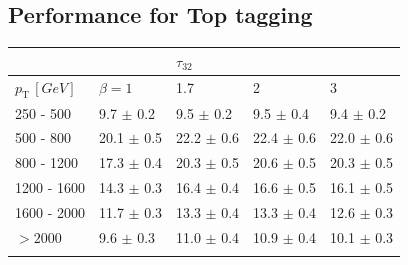 \subsection{Performance for Top tagging}\label{appendix:top_optimisation}
\begin{table}[H]
\centering
\begin{tabular}{lllll}
\rowcolor{Gray} \multicolumn{1}{l||}{\textbf{Calorimeter}}    &                                & $\tau_{32}$               &                           & \multicolumn{1}{l|}{}     \\ \hline
\multicolumn{1}{l||}{$p_{\mathrm{T}} \, [GeV]$} & \multicolumn{1}{l|}{$\beta=1$} & \multicolumn{1}{l|}{\cellcolor{Gray2}1.7}  & \multicolumn{1}{l|}{\cellcolor{Gray2}2}    & \multicolumn{1}{l|}{\cellcolor{Gray2}3}    \\ \hline \hline
\multicolumn{1}{l||}{250 - 500}      & \multicolumn{1}{l|}{\cellcolor{Red!50}9.7 $\pm$ 0.2}       	& \multicolumn{1}{l|}{9.5 $\pm$ 0.2}  					& \multicolumn{1}{l|}{9.5 $\pm$ 0.4}  					& \multicolumn{1}{l|}{9.4 $\pm$ 0.2}  \\
\multicolumn{1}{l||}{500 - 800}      & \multicolumn{1}{l|}{20.1 $\pm$ 0.5}      					& \multicolumn{1}{l|}{22.2 $\pm$ 0.6} 					& \multicolumn{1}{l|}{\cellcolor{Red!50}22.4 $\pm$ 0.6} & \multicolumn{1}{l|}{22.0 $\pm$ 0.6} \\
\multicolumn{1}{l||}{800 - 1200}     & \multicolumn{1}{l|}{17.3 $\pm$ 0.4}      					& \multicolumn{1}{l|}{20.3 $\pm$ 0.5} 					& \multicolumn{1}{l|}{\cellcolor{Red!50}20.6 $\pm$ 0.5} & \multicolumn{1}{l|}{20.3 $\pm$ 0.5} \\
\multicolumn{1}{l||}{1200 - 1600}    & \multicolumn{1}{l|}{14.3 $\pm$ 0.3}      					& \multicolumn{1}{l|}{16.4 $\pm$ 0.4} 					& \multicolumn{1}{l|}{\cellcolor{Red!50}16.6 $\pm$ 0.5} & \multicolumn{1}{l|}{16.1 $\pm$ 0.5} \\
\multicolumn{1}{l||}{1600 - 2000}    & \multicolumn{1}{l|}{11.7 $\pm$ 0.3}      					& \multicolumn{1}{l|}{\cellcolor{Red!50}13.3 $\pm$ 0.4} & \multicolumn{1}{l|}{\cellcolor{Red!50}13.3 $\pm$ 0.4} & \multicolumn{1}{l|}{12.6 $\pm$ 0.3} \\
\multicolumn{1}{l||}{$>2000$}        & \multicolumn{1}{l|}{9.6 $\pm$ 0.3}       					& \multicolumn{1}{l|}{\cellcolor{Red!50}11.0 $\pm$ 0.4} & \multicolumn{1}{l|}{10.9 $\pm$ 0.4} 					& \multicolumn{1}{l|}{10.1 $\pm$ 0.3} \\ \hline
                                    &                                &                           &                           &                           \\

\end{tabular}
\end{table}
